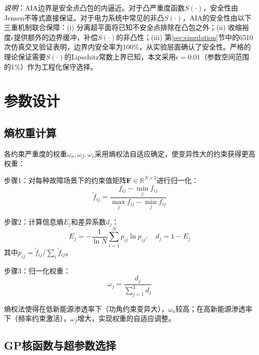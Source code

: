 \documentclass[a4paper,11pt]{ctexart}
\begin{document}
\textit{说明}：AIA边界是安全点凸包的内逼近。对于凸严重度函数$S(\cdot)$，安全性由Jensen不等式直接保证。对于电力系统中常见的非凸$S(\cdot)$，AIA的安全性由以下三重机制联合保障：(i) 分离超平面将已知不安全点排除在凸包之外；(ii) 收缩裕度$\epsilon$提供额外的边界缓冲，补偿$S(\cdot)$的非凸性；(iii) 第\ref{sec:simulation}节中的6510次仿真交叉验证表明，边界内安全率为100\%，从实验层面确认了安全性。严格的理论保证需要$S(\cdot)$的Lipschitz常数上界已知，本文采用$\epsilon = 0.01$（参数空间范围的1\%）作为工程化保守选择。

\section{参数设计}
\label{sec:parameters}

\subsection{熵权重计算}

各约束严重度的权重$\omega_a, \omega_f, \omega_v$采用熵权法自适应确定，使变异性大的约束获得更高权重：

步骤1：对每种故障场景下的约束值矩阵$\mathbf{F} \in \mathbb{R}^{N \times 3}$进行归一化：
\begin{equation}
    \tilde{f}_{ij} = \frac{f_{ij} - \min_j f_{ij}}{\max_j f_{ij} - \min_j f_{ij}}
    \label{eq:normalize}
\end{equation}

步骤2：计算信息熵$E_j$和差异系数$d_j$：
\begin{equation}
    E_j = -\frac{1}{\ln N} \sum_{i=1}^N p_{ij} \ln p_{ij}, \quad d_j = 1 - E_j
    \label{eq:entropy}
\end{equation}
其中$p_{ij} = \tilde{f}_{ij} / \sum_i \tilde{f}_{ij}$。

步骤3：归一化权重：
\begin{equation}
    \omega_j = \frac{d_j}{\sum_{j=1}^3 d_j}
    \label{eq:entropy_weight}
\end{equation}

熵权法使得在低新能源渗透率下（功角约束变异大），$\omega_a$较高；在高新能源渗透率下（频率约束激活），$\omega_f$增大，实现权重的自适应调整。

\subsection{GP核函数与超参数选择}
\end{document}
